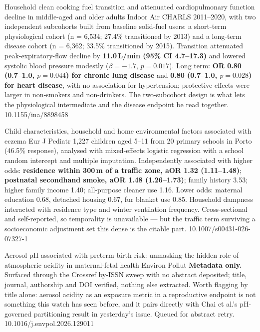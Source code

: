 \documentclass[10pt]{article}
\begin{document}

{Household clean cooking fuel transition and attenuated cardiopulmonary function decline in middle-aged and older adults}
{Indoor Air}
{CHARLS 2011--2020, with two independent subcohorts built from baseline solid-fuel users:
a short-term physiological cohort (n = 6{,}534; 27.4\% transitioned by 2013) and a
long-term disease cohort (n = 6{,}362; 33.5\% transitioned by 2015). Transition attenuated
peak-expiratory-flow decline by \textbf{11.0\,L/min (95\% CI 4.7--17.3)} and lowered
systolic blood pressure modestly ($\beta = -1.7$, $p = 0.017$). Long term:
\textbf{OR 0.80 (0.7--1.0, $p = 0.044$) for chronic lung disease} and \textbf{0.80
(0.7--1.0, $p = 0.028$) for heart disease}, with no association for hypertension;
protective effects were larger in non-smokers and non-drinkers. The two-subcohort design
is what lets the physiological intermediate and the disease endpoint be read together.}
{10.1155/ina/8898458}


{Child characteristics, household and home environmental factors associated with eczema}
{Eur J Pediatr}
{1{,}227 children aged 5--11 from 20 primary schools in Porto (46.5\% response), analysed
with mixed-effects logistic regression with a school random intercept and multiple
imputation. Independently associated with higher odds: \textbf{residence within 300\,m of
a traffic zone, aOR 1.32 (1.11--1.48)}; \textbf{postnatal secondhand smoke, aOR 1.48
(1.26--1.73)}; family history 3.53; higher family income 1.40; all-purpose cleaner use
1.16. Lower odds: maternal education 0.68, detached housing 0.67, fur blanket use 0.85.
Household dampness interacted with residence type and winter ventilation frequency.
Cross-sectional and self-reported, so temporality is unavailable --- but the traffic term
surviving a socioeconomic adjustment set this dense is the citable part.}
{10.1007/s00431-026-07327-1}


{Aerosol pH associated with preterm birth risk: unmasking the hidden role of atmospheric acidity in maternal-fetal health}
{Environ Pollut}
{\textbf{Metadata only.} Surfaced through the Crossref by-ISSN sweep with no abstract
deposited; title, journal, authorship and DOI verified, nothing else extracted. Worth
flagging by title alone: aerosol acidity as an exposure metric in a reproductive endpoint
is not something this watch has seen before, and it pairs directly with Chai et al.'s
pH-governed partitioning result in yesterday's issue. Queued for abstract retry.}
{10.1016/j.envpol.2026.129011}
\end{document}
